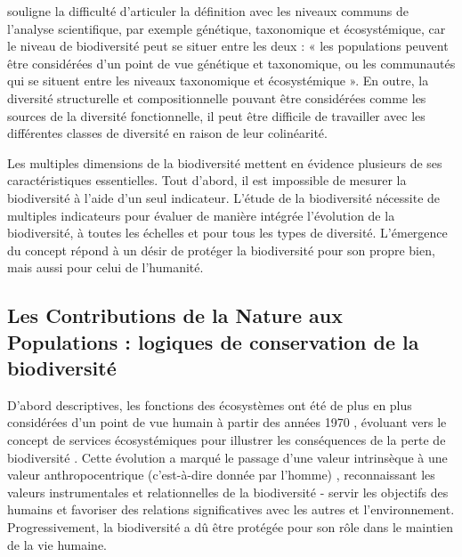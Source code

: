 \cite{mouysset_diversity_2023} souligne la difficulté d'articuler la définition avec les niveaux communs de l'analyse scientifique, par exemple génétique, taxonomique et écosystémique, car le niveau de biodiversité peut se situer entre les deux : « les populations peuvent être considérées d'un point de vue génétique et taxonomique, ou les communautés qui se situent entre les niveaux taxonomique et écosystémique ». En outre, la diversité structurelle et compositionnelle pouvant être considérées comme les sources de la diversité fonctionnelle, il peut être difficile de travailler avec les différentes classes de diversité en raison de leur colinéarité. 

Les multiples dimensions de la biodiversité mettent en évidence plusieurs de ses caractéristiques essentielles. Tout d'abord, il est impossible de mesurer la biodiversité à l'aide d'un seul indicateur. L'étude de la biodiversité nécessite de multiples indicateurs pour évaluer de manière intégrée l'évolution de la biodiversité, à toutes les échelles et pour tous les types de diversité. L'émergence du concept répond à un désir de protéger la biodiversité pour son propre bien, mais aussi pour celui de l'humanité. 

{}
\subsection*{Les Contributions de la Nature aux Populations : logiques de conservation de la biodiversité}

D'abord descriptives, les fonctions des écosystèmes ont été de plus en plus considérées d'un point de vue humain à partir des années 1970 \citep{hueting1969functions, schumacher1973small}, évoluant vers le concept de services écosystémiques \citep{ehrlich1981extinction} pour illustrer les conséquences de la perte de biodiversité \citep{gomez_history_2010}. Cette évolution a marqué le passage d'une valeur intrinsèque à une valeur anthropocentrique (c'est-à-dire donnée par l'homme) \citep{mouysset_diversity_2023}, reconnaissant les valeurs instrumentales et relationnelles de la biodiversité - servir les objectifs des humains et favoriser des relations significatives avec les autres et l'environnement. Progressivement, la biodiversité a dû être protégée pour son rôle dans le maintien de la vie humaine.


